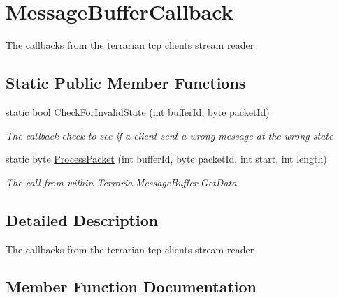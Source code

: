 \hypertarget{classOTA_1_1Callbacks_1_1MessageBufferCallback}{}\section{Message\+Buffer\+Callback}
\label{classOTA_1_1Callbacks_1_1MessageBufferCallback}


The callbacks from the terrarian tcp clients\textquotesingle{} stream reader  


\subsection*{Static Public Member Functions}
\begin{DoxyCompactItemize}
\item 
static bool \hyperlink{classOTA_1_1Callbacks_1_1MessageBufferCallback_af1f90c9ec6ecd3e8ec1fad19449589ee}{Check\+For\+Invalid\+State} (int buffer\+Id, byte packet\+Id)
\begin{DoxyCompactList}\small\item\em The callback check to see if a client sent a wrong message at the wrong state \end{DoxyCompactList}\item 
static byte \hyperlink{classOTA_1_1Callbacks_1_1MessageBufferCallback_a7b882aa35141825ee08c6401cc3349b7}{Process\+Packet} (int buffer\+Id, byte packet\+Id, int start, int length)
\begin{DoxyCompactList}\small\item\em The call from within Terraria.\+Message\+Buffer.\+Get\+Data \end{DoxyCompactList}\end{DoxyCompactItemize}


\subsection{Detailed Description}
The callbacks from the terrarian tcp clients\textquotesingle{} stream reader 



\subsection{Member Function Documentation}
\hypertarget{classOTA_1_1Callbacks_1_1MessageBufferCallback_af1f90c9ec6ecd3e8ec1fad19449589ee}{}
